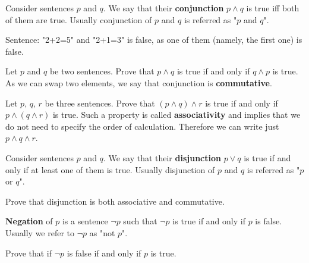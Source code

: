 \begin{definition}
  Consider sentences $p$ and $q$. We say that their \textbf{conjunction} $p\wedge q$ is true iff both of them are true. Usually conjunction of $p$ and $q$ is
  referred as "$p$ and $q$".
\end{definition}

\begin{example}
  Sentence: "2+2=5" and "2+1=3" is false, as one of them (namely, the first one) is false.
\end{example}

\begin{exercise}
  Let $p$ and $q$ be two sentences. Prove that $p\wedge q$ is true if and only if $q\wedge p$ is true. As we can swap two elements, we say that conjunction is \textbf{commutative}.
\end{exercise}

\begin{exercise}
  Let $p,\, q,\, r$ be three sentences. Prove that $(p\wedge q)\wedge r$ is true if and only if $p\wedge (q\wedge r)$ is true. Such a property is called \textbf{associativity}
  and implies that we do not need to specify the order of calculation. Therefore we can write just $p\wedge q\wedge r$.
\end{exercise}

\begin{definition}
  Consider sentences $p$ and $q$. We say that their \textbf{disjunction} $p\vee q$ is true if and only if at least one of them is true. Usually disjunction of $p$ and $q$ is
  referred as "$p$ or $q$".
\end{definition}

\begin{exercise}
  Prove that disjunction is both associative and commutative.
\end{exercise}

\begin{definition}
  \textbf{Negation} of $p$ is a sentence $\neg p$ such that $\neg p$ is true if and only if $p$ is false. Usually we refer to $\neg p$ as "not $p$".
\end{definition}

\begin{exercise}
  Prove that if $\neg p$ is false if and only if $p$ is true.
\end{exercise}


